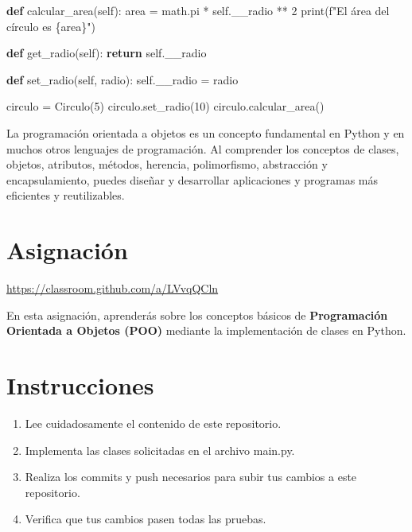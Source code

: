 \documentclass[
  a4paper,
  DIV=11,
  numbers=noendperiod,
  onepage,
  openany]{scrreprt}
\newenvironment{Shaded}{\begin{snugshade}}{\end{snugshade}}
\newcommand{\BuiltInTok}[1]{\textcolor[rgb]{0.00,0.23,0.31}{#1}}
\newcommand{\ControlFlowTok}[1]{\textcolor[rgb]{0.00,0.23,0.31}{\textbf{#1}}}
\newcommand{\DecValTok}[1]{\textcolor[rgb]{0.68,0.00,0.00}{#1}}
\newcommand{\KeywordTok}[1]{\textcolor[rgb]{0.00,0.23,0.31}{\textbf{#1}}}
\newcommand{\NormalTok}[1]{\textcolor[rgb]{0.00,0.23,0.31}{#1}}
\newcommand{\OperatorTok}[1]{\textcolor[rgb]{0.37,0.37,0.37}{#1}}
\newcommand{\SpecialCharTok}[1]{\textcolor[rgb]{0.37,0.37,0.37}{#1}}
\newcommand{\SpecialStringTok}[1]{\textcolor[rgb]{0.13,0.47,0.30}{#1}}
\newcommand{\VariableTok}[1]{\textcolor[rgb]{0.07,0.07,0.07}{#1}}
\providecommand{\tightlist}{%
  \setlength{\itemsep}{0pt}\setlength{\parskip}{0pt}}\usepackage{longtable,booktabs,array}
\begin{document}
\begin{tcolorbox}
\begin{Shaded}
\begin{Highlighting}[]
    \KeywordTok{def}\NormalTok{ calcular\_area(}\VariableTok{self}\NormalTok{):}
\NormalTok{        area }\OperatorTok{=}\NormalTok{ math.pi }\OperatorTok{*} \VariableTok{self}\NormalTok{.\_\_radio }\OperatorTok{**} \DecValTok{2}
        \BuiltInTok{print}\NormalTok{(}\SpecialStringTok{f"El área del círculo es }\SpecialCharTok{\{}\NormalTok{area}\SpecialCharTok{\}}\SpecialStringTok{"}\NormalTok{)}

    \KeywordTok{def}\NormalTok{ get\_radio(}\VariableTok{self}\NormalTok{):}
        \ControlFlowTok{return} \VariableTok{self}\NormalTok{.\_\_radio}

    \KeywordTok{def}\NormalTok{ set\_radio(}\VariableTok{self}\NormalTok{, radio):}
        \VariableTok{self}\NormalTok{.\_\_radio }\OperatorTok{=}\NormalTok{ radio}
        
\NormalTok{circulo }\OperatorTok{=}\NormalTok{ Circulo(}\DecValTok{5}\NormalTok{)}
\NormalTok{circulo.set\_radio(}\DecValTok{10}\NormalTok{)}
\NormalTok{circulo.calcular\_area()}
\end{Highlighting}
\end{Shaded}

La programación orientada a objetos es un concepto fundamental en Python
y en muchos otros lenguajes de programación. Al comprender los conceptos
de clases, objetos, atributos, métodos, herencia, polimorfismo,
abstracción y encapsulamiento, puedes diseñar y desarrollar aplicaciones
y programas más eficientes y reutilizables.

\section{Asignación}\label{asignaciuxf3n-4}

\href{https://classroom.github.com/a/nSsw5Xmn}{https://classroom.github.com/a/LVvqQCln}

En esta asignación, aprenderás sobre los conceptos básicos de
\textbf{Programación Orientada a Objetos (POO)} mediante la
implementación de clases en Python.

\section{Instrucciones}\label{instrucciones}

\begin{enumerate}
\def\labelenumi{\arabic{enumi}.}
\tightlist
\item
  Lee cuidadosamente el contenido de este repositorio.
\item
  Implementa las clases solicitadas en el archivo main.py.
\item
  Realiza los commits y push necesarios para subir tus cambios a este
  repositorio.
\item
  Verifica que tus cambios pasen todas las pruebas.
\end{enumerate}


\end{tcolorbox}
\end{document}
